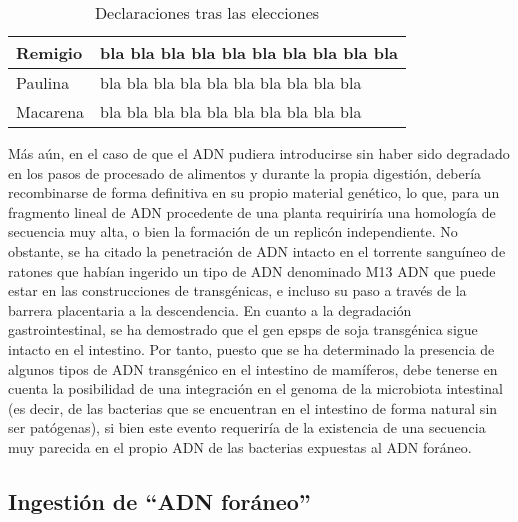 \documentclass[11pt,twoside]{article}
\begin{document}
%

\begin{table}[h!]
\begin{center}
\begin{tabular}{|l@{ dijo: }p{4cm}|}
\hline
Remigio  &  bla bla bla bla bla bla bla bla bla bla  \\
\hline
Paulina  &  bla bla bla bla bla bla bla bla bla bla  \\
\hline
Macarena &  bla bla bla bla bla bla bla bla bla bla  \\
\hline
\end{tabular}
\end{center}
\caption{Declaraciones tras las elecciones}\label{tabla.blablabla}
\end{table}




Más aún, en el caso de que el ADN pudiera introducirse sin haber sido degradado en los pasos de procesado de alimentos y durante la propia digestión, debería recombinarse de forma definitiva en su propio material genético, lo que, para un fragmento lineal de ADN procedente de una planta requiriría una homología de secuencia muy alta, o bien la formación de un replicón independiente. 
No obstante, se ha citado la penetración de ADN intacto en el torrente sanguíneo de ratones que habían ingerido un tipo de ADN denominado M13 ADN que puede estar en las construcciones de transgénicas, e incluso su paso a través de la barrera placentaria a la descendencia.
En cuanto a la degradación gastrointestinal, se ha demostrado que el gen epsps de soja transgénica sigue intacto en el intestino. Por tanto, puesto que se ha determinado la presencia de algunos tipos de ADN transgénico en el intestino de mamíferos, debe tenerse en cuenta la posibilidad de una integración en el genoma de la microbiota intestinal (es decir, de las bacterias que se encuentran en el intestino de forma natural sin ser patógenas), si bien este evento requeriría de la existencia de una secuencia muy parecida en el propio ADN de las bacterias expuestas al ADN foráneo.






\subsection{Ingestión de ``ADN foráneo''}
\end{document}
